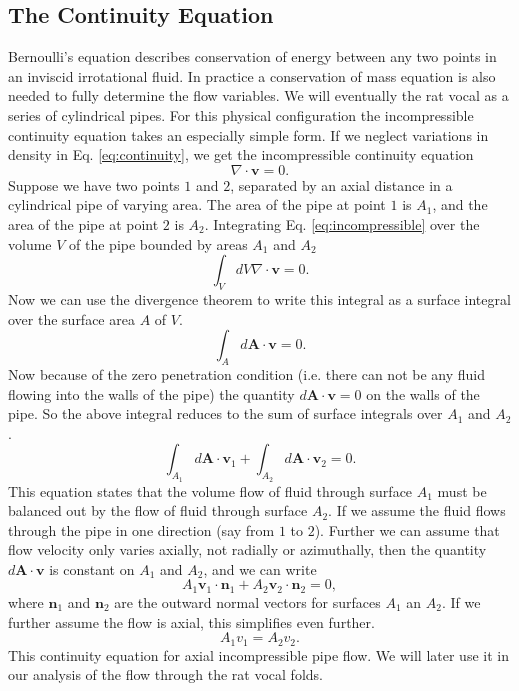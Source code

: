 \documentclass[12pt, letter]{report}
\begin{document}
\subsection{The Continuity Equation}
Bernoulli's equation describes conservation of energy between any two points in an inviscid irrotational fluid. In practice a conservation of mass equation is also needed to fully determine the flow variables. We will eventually the rat vocal as a series of cylindrical pipes. For this physical configuration the incompressible continuity equation takes an especially simple form. If we neglect variations in density in Eq. \ref{eq:continuity}, we get the incompressible continuity equation
\begin{equation} 
\label{eq:incompressible}
\nabla \cdot \textbf{v}=0.
\end{equation}
Suppose we have two points $1$ and $2$, separated by an axial distance in a cylindrical pipe of varying area. The area of the pipe at point $1$ is $A_1$, and the area of the pipe at point $2$ is $A_2$. Integrating Eq. \ref{eq:incompressible} over the volume $V$ of the pipe bounded by areas $A_1$ and $A_2$
\begin{equation} 
\int_V dV \nabla \cdot \textbf{v}=0.
\end{equation}
Now we can use the divergence theorem to write this integral as a surface integral over the surface area $A$ of $V$.
\begin{equation} 
\int_A d\textbf{A} \cdot \textbf{v}=0.
\end{equation}
Now because of the zero penetration condition (i.e. there can not be any fluid flowing into the walls of the pipe) the quantity $d\textbf{A} \cdot \textbf{v}=0$ on the walls of the pipe. So the above integral reduces to the sum of surface integrals over $A_1$ and $A_2$.
\begin{equation} 
\int_{A_1} d\textbf{A} \cdot \textbf{v}_1 + \int_{A_2} d\textbf{A} \cdot \textbf{v}_2=0.
\end{equation}
This equation states that the volume flow of fluid through surface $A_1$ must be balanced out by the flow of fluid through surface $A_2$. If we assume the fluid flows through the pipe in one direction (say from $1$ to $2$). Further we can assume that flow velocity only varies axially, not radially or azimuthally, then the quantity $d\textbf{A} \cdot \textbf{v}$ is constant on $A_1$ and $A_2$, and we can write
\begin{equation} 
A_1 \textbf{v}_1 \cdot \textbf{n}_1 + A_2 \textbf{v}_2 \cdot \textbf{n}_2 =0,
\end{equation}
where $\textbf{n}_1$ and $\textbf{n}_2$ are the outward normal vectors for surfaces $A_1$ an $A_2$. If we further assume the flow is axial, this simplifies even further.
\begin{equation}
A_1 v_1 = A_2 v_2.
\end{equation}
This continuity equation for axial incompressible pipe flow. We will later use it in our analysis of the flow through the rat vocal folds.
\end{document}
